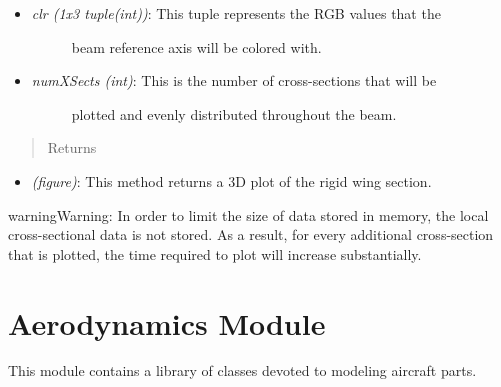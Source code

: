 \documentclass[letterpaper,10pt,english]{sphinxmanual}
\begin{document}
\begin{fulllineitems}
\begin{fulllineitems}
\begin{itemize}
\begin{description}
\end{description}

\item {} \begin{description}
\item[{\emph{clr (1x3 tuple(int))}: This tuple represents the RGB values that the}] \leavevmode
beam reference axis will be colored with.

\end{description}

\item {} \begin{description}
\item[{\emph{numXSects (int)}: This is the number of cross-sections that will be}] \leavevmode
plotted and evenly distributed throughout the beam.

\end{description}

\end{itemize}
\begin{quote}\begin{description}
\item[{Returns}] \leavevmode
\end{description}\end{quote}
\begin{itemize}
\item {} 
\emph{(figure)}: This method returns a 3D plot of the rigid wing section.

\end{itemize}

\begin{notice}{warning}{Warning:}
In order to limit the size of data stored in memory, the
local cross-sectional data is not stored. As a result, for every
additional cross-section that is plotted, the time required to plot
will increase substantially.
\end{notice}

\end{fulllineitems}


\end{fulllineitems}



\section{Aerodynamics Module}
\label{aerodynamics::doc}\label{aerodynamics:aerodynamics-module}\label{aerodynamics:module-AeroComBAT.Aerodynamics}
This module contains a library of classes devoted to modeling aircraft parts.
\end{document}
